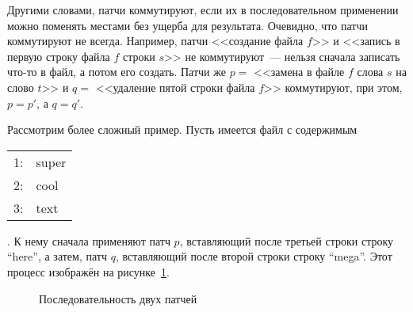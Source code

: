 Другими словами, патчи коммутируют, если их в последовательном
применении можно поменять местами без ущерба для результата.
Очевидно, что патчи коммутируют не всегда. Например, патчи <<создание
файла $f$>> и <<запись в первую строку файла $f$ строки $s$>> не
коммутируют~--- нельзя сначала записать что-то в файл, а потом его
создать. Патчи же $p = $ <<замена в файле $f$ слова $s$ на слово $t$>>
и $q = $ <<удаление пятой строки файла $f$>> коммутируют, при этом, $p
= p'$, а $q = q'$. 

Рассмотрим более сложный пример. Пусть имеется файл с содержимым 
\begin{tabular}{|r|l|}
  \hline
  1: & super \\
  2: & cool \\
  3: & text \\
  \hline
\end{tabular}. 
К нему сначала применяют патч $p$, вставляющий после
третьей строки строку ``here'', а
затем, патч $q$, вставляющий после второй строки строку ``mega''. 
Этот процесс изображён на рисунке~\ref{fig:commute-before}.

\begin{figure}
  \centering
  \caption{Последовательность двух патчей}
  \label{fig:commute-before}
\end{figure}

